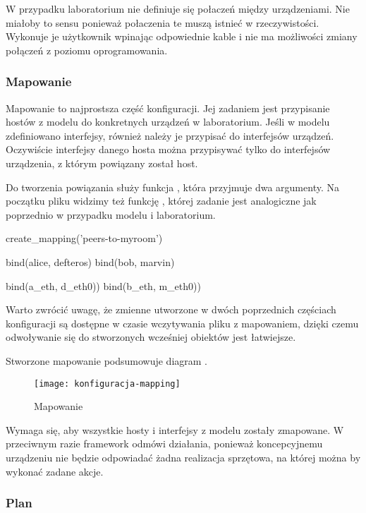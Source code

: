 \documentclass[00-praca-magisterska.tex]{subfiles}
\begin{document}
W przypadku laboratorium nie definiuje się połaczeń między urządzeniami. Nie
miałoby to sensu ponieważ połaczenia te muszą istnieć w rzeczywistości.
Wykonuje je użytkownik wpinając odpowiednie kable i nie ma możliwości zmiany
połączeń z poziomu oprogramowania.

\subsubsection{Mapowanie}

Mapowanie to najprostsza część konfiguracji. Jej zadaniem jest przypisanie
hostów z modelu do konkretnych urządzeń w laboratorium. Jeśli w modelu
zdefiniowano interfejsy, również należy je przypisać do interfejsów urządzeń.
Oczywiście interfejsy danego hosta można przypisywać tylko do interfejsów
urządzenia, z którym powiązany został host.

Do tworzenia powiązania służy funkcja , która przyjmuje dwa
argumenty. Na początku pliku widzimy też funkcję , której
zadanie jest analogiczne jak poprzednio w przypadku modelu i laboratorium.

\begin{pythoncode}
  create_mapping('peers-to-myroom')

  bind(alice, defteros)
  bind(bob,   marvin)

  bind(a_eth, d_eth0))
  bind(b_eth, m_eth0))
\end{pythoncode}

Warto zwrócić uwagę, że zmienne utworzone w dwóch poprzednich częściach
konfiguracji są dostępne w czasie wczytywania pliku z mapowaniem, dzięki czemu
odwoływanie się do stworzonych wcześniej obiektów jest łatwiejsze.

Stworzone mapowanie podsumowuje diagram .

\begin{figure}[htb]
\begin{center}
\leavevmode
\texttt{[image: konfiguracja-mapping]}
\end{center}
\caption{Mapowanie}
\label{fig:konfiguracja-mapping}
\end{figure}

Wymaga się, aby wszystkie hosty i interfejsy z modelu zostały zmapowane. W
przeciwnym razie framework odmówi działania, ponieważ koncepcyjnemu urządzeniu
nie będzie odpowiadać żadna realizacja sprzętowa, na której można by wykonać
zadane akcje.

\subsubsection{Plan}
\end{document}
